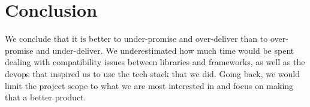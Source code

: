 
\section{Conclusion}\label{sec:conclusion}
    We conclude that it is better to under-promise and over-deliver than to over-promise and under-deliver. We underestimated how much time would be spent dealing with compatibility issues between libraries and frameworks, as well as the devops that inspired us to use the tech stack that we did. Going back, we would limit the project scope to what we are most interested in and focus on making that a better product.
